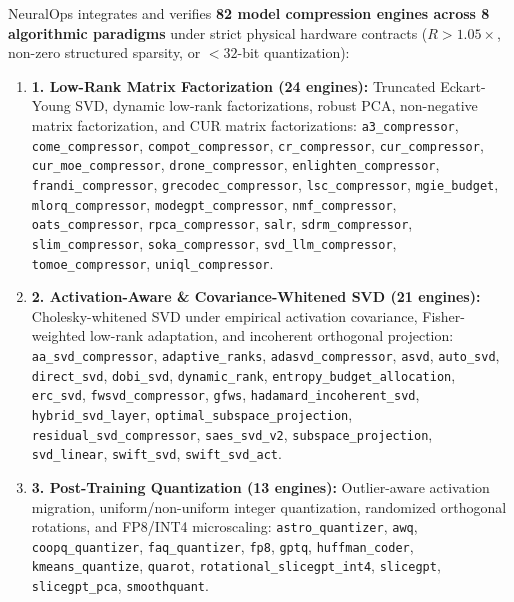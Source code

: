 \documentclass{article}
\begin{document}
NeuralOps integrates and verifies \textbf{82 model compression engines across 8 algorithmic paradigms} under strict physical hardware contracts ($R > 1.05\times$, non-zero structured sparsity, or $<32$-bit quantization):
\begin{enumerate}
    \item \textbf{1. Low-Rank Matrix Factorization (24 engines):}
    Truncated Eckart-Young SVD, dynamic low-rank factorizations, robust PCA, non-negative matrix factorization, and CUR matrix factorizations:
    \texttt{a3\_compressor},
    \texttt{come\_compressor},
    \texttt{compot\_compressor},
    \texttt{cr\_compressor},
    \texttt{cur\_compressor},
    \texttt{cur\_moe\_compressor},
    \texttt{drone\_compressor},
    \texttt{enlighten\_compressor},
    \texttt{frandi\_compressor},
    \texttt{grecodec\_compressor},
    \texttt{lsc\_compressor},
    \texttt{mgie\_budget},
    \texttt{mlorq\_compressor},
    \texttt{modegpt\_compressor},
    \texttt{nmf\_compressor},
    \texttt{oats\_compressor},
    \texttt{rpca\_compressor},
    \texttt{salr},
    \texttt{sdrm\_compressor},
    \texttt{slim\_compressor},
    \texttt{soka\_compressor},
    \texttt{svd\_llm\_compressor},
    \texttt{tomoe\_compressor},
    \texttt{uniql\_compressor}.

    \item \textbf{2. Activation-Aware \& Covariance-Whitened SVD (21 engines):}
    Cholesky-whitened SVD under empirical activation covariance, Fisher-weighted low-rank adaptation, and incoherent orthogonal projection:
    \texttt{aa\_svd\_compressor},
    \texttt{adaptive\_ranks},
    \texttt{adasvd\_compressor},
    \texttt{asvd},
    \texttt{auto\_svd},
    \texttt{direct\_svd},
    \texttt{dobi\_svd},
    \texttt{dynamic\_rank},
    \texttt{entropy\_budget\_allocation},
    \texttt{erc\_svd},
    \texttt{fwsvd\_compressor},
    \texttt{gfws},
    \texttt{hadamard\_incoherent\_svd},
    \texttt{hybrid\_svd\_layer},
    \texttt{optimal\_subspace\_projection},
    \texttt{residual\_svd\_compressor},
    \texttt{saes\_svd\_v2},
    \texttt{subspace\_projection},
    \texttt{svd\_linear},
    \texttt{swift\_svd},
    \texttt{swift\_svd\_act}.

    \item \textbf{3. Post-Training Quantization (13 engines):}
    Outlier-aware activation migration, uniform/non-uniform integer quantization, randomized orthogonal rotations, and FP8/INT4 microscaling:
    \texttt{astro\_quantizer},
    \texttt{awq},
    \texttt{coopq\_quantizer},
    \texttt{faq\_quantizer},
    \texttt{fp8},
    \texttt{gptq},
    \texttt{huffman\_coder},
    \texttt{kmeans\_quantize},
    \texttt{quarot},
    \texttt{rotational\_slicegpt\_int4},
    \texttt{slicegpt},
    \texttt{slicegpt\_pca},
    \texttt{smoothquant}.


\end{enumerate}
\end{document}

